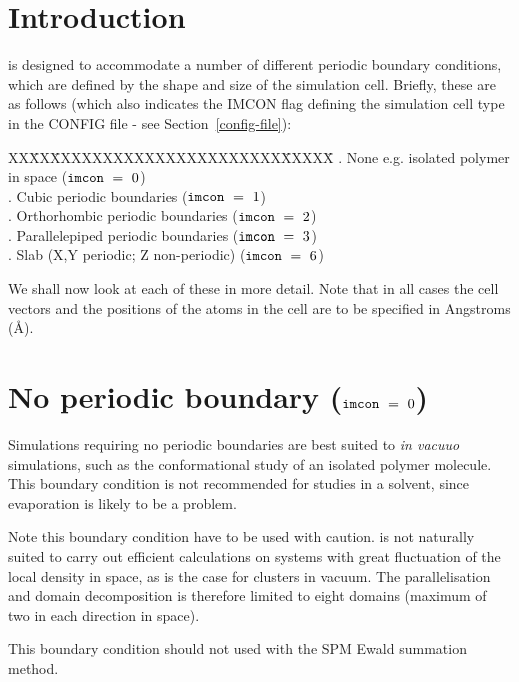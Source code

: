 \label{boundary-conditions}
\section{Introduction}

\D is designed to accommodate a number of different periodic
boundary conditions, which are defined
by the shape and size of the simulation cell.  Briefly, these are
as follows (which also indicates the IMCON flag defining the
simulation cell type in the CONFIG file - see Section~\ref{config-file}):
\begin{tabbing}
XX\=XX\=XXXXXXXXXXXXXXXXXXXXXX\=XXXXX\=\kill
 . \> None e.g. isolated polymer in space                  \> (${\tt imcon}~=~0$) \\
 . \> Cubic periodic boundaries \> (${\tt imcon}~=~1$) \\
 . \> Orthorhombic periodic boundaries                     \> (${\tt imcon}~=~2$) \\
 . \> Parallelepiped periodic boundaries                   \> (${\tt imcon}~=~3$) \\
 . \> Slab (X,Y periodic; Z non-periodic)                  \> (${\tt imcon}~=~6$)
\end{tabbing}
We shall now look at each of these in more detail.  Note that in
all cases the cell vectors and the positions of the atoms in the
cell are to be specified in Angstroms (\AA).

\section{No periodic boundary (${\tt imcon}~=~0$)}

Simulations requiring no periodic boundaries are best suited to
{\em in vacuuo} simulations, such as the conformational study of
an isolated polymer molecule.  This boundary condition is not
recommended for studies in a solvent, since evaporation is likely
to be a problem.

Note this boundary condition have to be used with caution.  \D is
not naturally suited to carry out efficient calculations on
systems with great fluctuation of the local density in space, as
is the case for clusters in vacuum.  The parallelisation and
domain decomposition is therefore limited to eight domains
(maximum of two in each direction in space).

This boundary condition should not used with the SPM Ewald
summation method.

